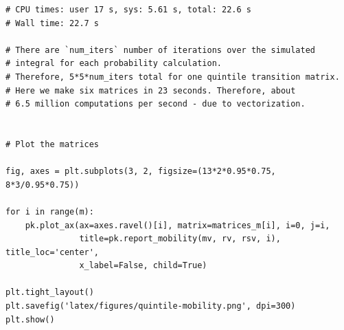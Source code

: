 \documentclass[a4paper,11pt]{article} %
\begin{document}
\begin{verbatim}
# CPU times: user 17 s, sys: 5.61 s, total: 22.6 s
# Wall time: 22.7 s

# There are `num_iters` number of iterations over the simulated 
# integral for each probability calculation.
# Therefore, 5*5*num_iters total for one quintile transition matrix. 
# Here we make six matrices in 23 seconds. Therefore, about 
# 6.5 million computations per second - due to vectorization. 


# Plot the matrices

fig, axes = plt.subplots(3, 2, figsize=(13*2*0.95*0.75, 8*3/0.95*0.75))

for i in range(m):
    pk.plot_ax(ax=axes.ravel()[i], matrix=matrices_m[i], i=0, j=i, 
               title=pk.report_mobility(mv, rv, rsv, i), title_loc='center', 
               x_label=False, child=True)

plt.tight_layout()
plt.savefig('latex/figures/quintile-mobility.png', dpi=300)
plt.show()


\end{verbatim}

\end{document}
